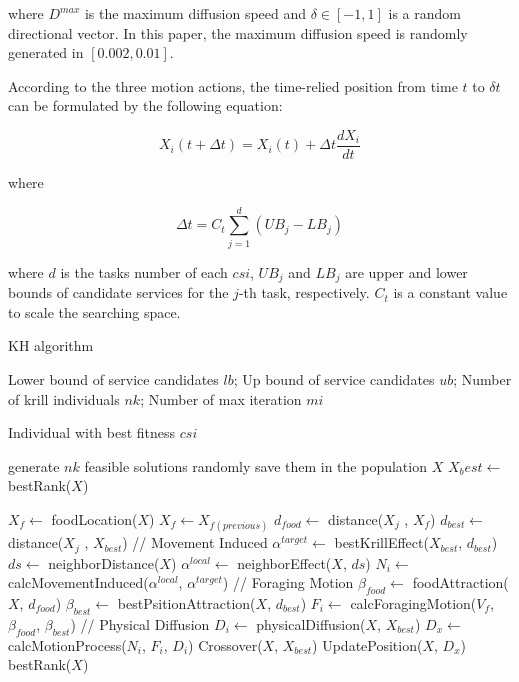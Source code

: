 \documentclass[10pt,journal,compsoc]{IEEEtran}
\begin{document}
where $D^{max}$ is the maximum diffusion speed and $\delta \in [-1, 1]$ is a random directional vector. In this paper, the maximum diffusion speed is randomly generated in $[0.002, 0.01]$. 

According to the three motion actions, the time-relied position from time $t$ to $\delta t$ can be formulated by the following equation:

\begin{equation}
X_i(t+\Delta t) = X_i(t) + \Delta t \frac{dX_i}{dt}
\end{equation}

where

\begin{equation}
\Delta t = C_t\sum_{j=1}^{d}(UB_j - LB_j)
\end{equation}

where $d$ is the tasks number of each $csi$, $UB_j$ and $LB_j$ are upper and lower bounds of candidate services for the $j$-th task, respectively. $C_t$ is a constant value to scale the searching space. 

\begin{algorithm}
\caption{KH algorithm}
\label{alg1}
\begin{algorithmic}[1]

\REQUIRE Lower bound of service candidates $lb$; Up bound of service candidates $ub$; Number of krill individuals $nk$; Number of max iteration $mi$

\ENSURE Individual with best fitness $csi$

\STATE generate $nk$ feasible solutions randomly
\STATE save them in the population $X$
\STATE $X_best \leftarrow$ bestRank($X$)

  \STATE $X_f \leftarrow$ foodLocation($X$)
    \STATE $X_f \leftarrow X_{f(previous)}$
  \ENDIF
    \STATE $d_{food} \leftarrow$ distance($X_j$ , $X_f$)
    \STATE $d_{best} \leftarrow$ distance($X_j$ , $X_{best}$)
    \STATE // Movement Induced
    \STATE $\alpha^{target} \leftarrow $ bestKrillEffect($X_{best}$, $d_{best}$)
    \STATE $ds \leftarrow $ neighborDistance($X$)
    \STATE $\alpha^{local} \leftarrow $ neighborEffect($X$, $ds$)
    \STATE $N_i \leftarrow$ calcMovementInduced($\alpha^{local}$, $\alpha^{target}$)
    \STATE // Foraging Motion
    \STATE $\beta_{food} \leftarrow$ foodAttraction($X$, $d_{food}$)
    \STATE $\beta_{best} \leftarrow$ bestPsitionAttraction($X$, $d_{best}$)
    \STATE $F_i \leftarrow$ calcForagingMotion($V_f$, $\beta_{food}$, $\beta_{best}$)
    \STATE // Physical Diffusion
    \STATE $D_i \leftarrow$ physicalDiffusion($X$, $X_{best}$)
    \STATE $D_x \leftarrow$ calcMotionProcess($N_i$, $F_i$, $D_i$)
    \STATE Crossover($X$, $X_{best}$)
    \STATE UpdatePosition($X$, $D_x$)
  \ENDFOR
\ENDFOR
\RETURN bestRank($X$)

\end{algorithmic}
\end{algorithm}
\end{document}

